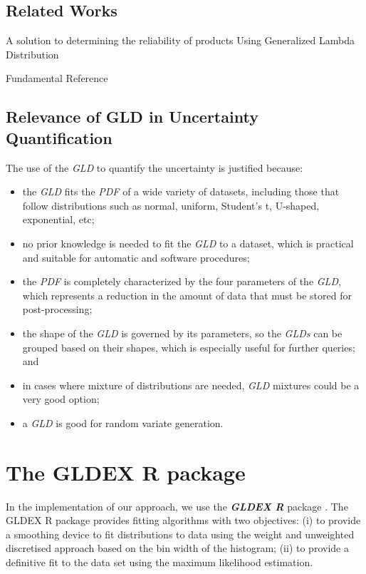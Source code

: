 \subsection{Related Works}
A solution to determining the reliability of products Using Generalized Lambda Distribution \cite{Movahedi2013}

Fundamental Reference \cite{Lampasi2006}

\subsection{Relevance of GLD in Uncertainty Quantification}
The use of the \textit{GLD} to quantify the uncertainty is justified because: 
\begin{itemize}
\item the \textit{GLD} fits the \textit{PDF} of a wide variety of datasets, including those that follow distributions such as normal, uniform, Student's t, U-shaped, exponential, etc;
\item no prior knowledge is needed to fit the \textit{GLD} to a dataset, which is practical and suitable for automatic and software procedures;
\item the \textit{PDF} is completely characterized by the four parameters of the \textit{GLD}, which represents a reduction in the amount of data that must be stored for post-processing;
\item the shape of the \textit{GLD} is governed by its parameters, so the \textit{GLDs} can be grouped  based on their shapes, which is especially useful for further queries; and
\item in cases where mixture of distributions are needed, \textit{GLD} mixtures could be a very good option;
\item a \textit{GLD} is good for random variate generation.
\end{itemize}
\cite{Ning2008} 

\section{The GLDEX R package}\label{sec:gldex}
In the implementation of our approach, we use the \textbf{\textit{GLDEX R}} package \cite{Su2007}. The GLDEX R package provides fitting algorithms with two objectives: (i) to provide a smoothing device to fit distributions to data using the weight and unweighted discretised approach based on the bin width of the histogram; (ii)  to provide a definitive fit to the data set using the maximum likelihood estimation.

